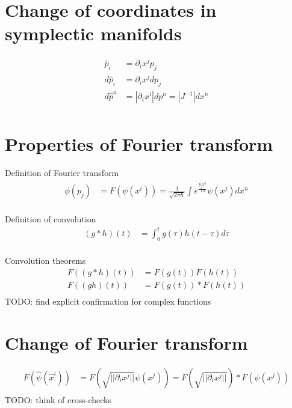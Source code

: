 \documentclass[11pt]{article}
\begin{document}
\section{Change of coordinates in symplectic manifolds}
\begin{equation}
	\begin{aligned}
		\hat{p}_i &= \partial_i x^j p_j \\
		d \hat{p}_i &= \partial_i x^j d p_j \\
		d\hat{p}^n &= | \partial_i x^i | dp^n = |J^{-1}| dx^n \\
	\end{aligned}
\end{equation}

\section{Properties of Fourier transform}

Definition of Fourier transform
\begin{equation}
	\begin{aligned}
		\phi(p_j) &= F(\psi(x^i)) = \frac{1}{\sqrt{2 \pi \hbar}} \int e^{\frac{p_j x^j}{\imath \hbar}} \psi(x^j) dx^n \\
	\end{aligned}
\end{equation}

Definition of convolution
\begin{equation}
	\begin{aligned}
		(g * h)(t) &= \int_{0}^{t} g(\tau) h(t-\tau) d\tau\\
	\end{aligned}
\end{equation}

Convolution theorems
\begin{equation}
	\begin{aligned}
		F((g * h)(t)) &= F(g(t)) F(h(t))\\
		F((g h)(t)) &= F(g(t)) * F(h(t))\\
	\end{aligned}
\end{equation}
TODO: find explicit confirmation for complex functions

\section{Change of Fourier transform}
\begin{equation}
	\begin{aligned}
		F(\hat{\psi}(\hat{x}^i)) &= F\left(\sqrt{|| \partial_i x^j ||} \psi(x^j)\right) = F\left(\sqrt{|| \partial_i x^j ||}\right) * F \left( \psi(x^j)\right)  \\
	\end{aligned}
\end{equation}
TODO: think of cross-checks
\end{document}
